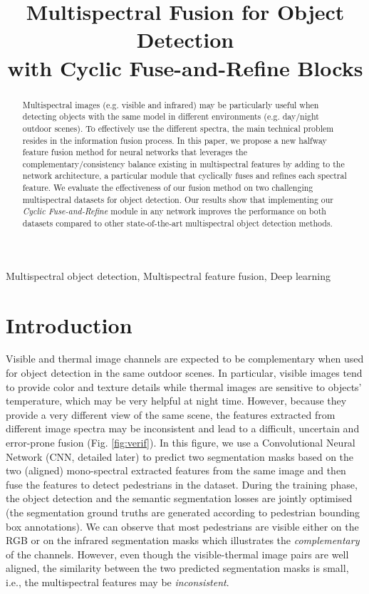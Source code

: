 \documentclass{article}
\title{Multispectral Fusion for Object Detection \\ with Cyclic Fuse-and-Refine Blocks}
\begin{document}
\maketitle









\begin{abstract}
Multispectral images (e.g. visible and infrared) may be particularly useful when detecting objects with the same model in different environments (e.g. day/night outdoor scenes). To effectively use the different spectra, the main technical problem resides in the information fusion process. In this paper, we propose a new halfway feature fusion method for neural networks that leverages the complementary/consistency balance existing in multispectral features by adding to the network architecture, a particular module that cyclically fuses and refines each spectral feature. We evaluate the effectiveness of our fusion method on two challenging multispectral datasets for object detection. Our results show that implementing our \textit{Cyclic Fuse-and-Refine} module in any network improves the performance on both datasets compared to other state-of-the-art multispectral object detection methods.
\end{abstract}
\begin{keywords}
Multispectral object detection, Multispectral feature fusion, Deep learning
\end{keywords}


\section{Introduction}
\label{introduction}

Visible and thermal image channels are expected to be complementary when used for object detection in the same outdoor scenes. In particular, visible images tend to provide color and texture details while thermal images are sensitive to objects' temperature, which may be very helpful at night time. However, because they provide a very different view of the same scene, the features extracted from different image spectra may be inconsistent and lead to a difficult, uncertain and error-prone fusion (Fig. \ref{fig:verif}). In this figure,  we use a Convolutional Neural Network (CNN, detailed later) to predict two segmentation masks based on the two (aligned) mono-spectral extracted features from the same image and then fuse the features to detect pedestrians in the dataset. During the training phase, the object detection and the semantic segmentation losses are jointly optimised (the segmentation ground truths are generated according to pedestrian bounding box annotations). We can observe that most pedestrians are visible either on the RGB or on the infrared segmentation masks which illustrates the \emph{complementary} of the channels. However, even though the visible-thermal image pairs are well aligned, the similarity between the two predicted segmentation masks is small, i.e., the multispectral features may be \emph{inconsistent}.
\end{document}
